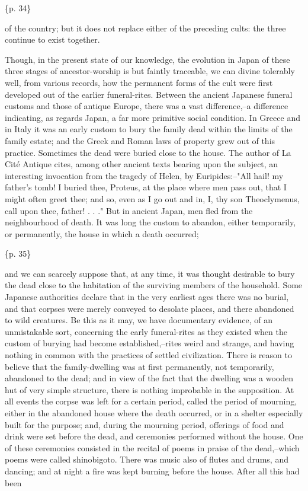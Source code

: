 \{p. 34\}

of the country; but it does not replace either of the preceding cults: the three continue to exist together.



Though, in the present state of our knowledge, the evolution in Japan of these three stages of ancestor-worship is but faintly traceable, we can divine tolerably well, from various records, how the permanent forms of the cult were first developed out of the earlier funeral-rites. Between the ancient Japanese funeral customs and those of antique Europe, there was a vast difference,--a difference indicating, as regards Japan, a far more primitive social condition. In Greece and in Italy it was an early custom to bury the family dead within the limits of the family estate; and the Greek and Roman laws of property grew out of this practice. Sometimes the dead were buried close to the house. The author of La Cité Antique cites, among other ancient texts bearing upon the subject, an interesting invocation from the tragedy of Helen, by Euripides:--"All hail! my father's tomb! I buried thee, Proteus, at the place where men pass out, that I might often greet thee; and so, even as I go out and in, I, thy son Theoclymenus, call upon thee, father! . . ." But in ancient Japan, men fled from the neighbourhood of death. It was long the custom to abandon, either temporarily, or permanently, the house in which a death occurred;

\{p. 35\}

and we can scarcely suppose that, at any time, it was thought desirable to bury the dead close to the habitation of the surviving members of the household. Some Japanese authorities declare that in the very earliest ages there was no burial, and that corpses were merely conveyed to desolate places, and there abandoned to wild creatures. Be this as it may, we have documentary evidence, of an unmistakable sort, concerning the early funeral-rites as they existed when the custom of burying had become established,--rites weird and strange, and having nothing in common with the practices of settled civilization. There is reason to believe that the family-dwelling was at first permanently, not temporarily, abandoned to the dead; and in view of the fact that the dwelling was a wooden hut of very simple structure, there is nothing improbable in the supposition. At all events the corpse was left for a certain period, called the period of mourning, either in the abandoned house where the death occurred, or in a shelter especially built for the purpose; and, during the mourning period, offerings of food and drink were set before the dead, and ceremonies performed without the house. One of these ceremonies consisted in the recital of poems in praise of the dead,--which poems were called shinobigoto. There was music also of flutes and drums, and dancing; and at night a fire was kept burning before the house. After all this had been

